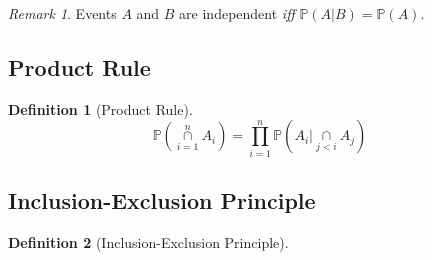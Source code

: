 \documentclass[11pt]{article}
\theoremstyle{definition}
\newtheorem{definition}{Definition}[section]
\theoremstyle{remark}
\newtheorem*{remark}{Remark}
\begin{document}
\begin{remark}
Events $A$ and $B$ are independent \textit{iff} $\mathbb{P}(A|B)=\mathbb{P}(A)$.
\end{remark}

\subsection{Product Rule}
\begin{definition}[Product Rule]
\[\mathbb{P}\left(\overset{n}{\underset{i=1}{\cap}} A_i \right) = \prod_{i=1}^{n} \mathbb{P}\left(  A_i | \underset{j<i}{\cap} A_j  \right)   \]
\end{definition}

\subsection{Inclusion-Exclusion Principle}
\begin{definition}[Inclusion-Exclusion Principle]
\end{definition}
\end{document}
